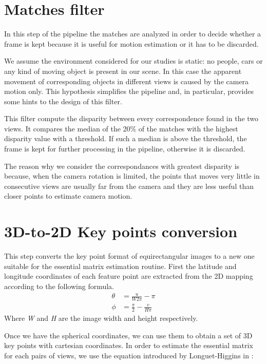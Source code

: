 \section{Matches filter}
In this step of the pipeline the matches are analyzed in order to decide 
whether a frame is kept because it is useful for motion estimation or 
it has to be discarded.

We assume the environment considered for our studies is static: no people, 
cars or any kind of moving object is present in our scene. In this case the 
apparent movement of corresponding objects in different views is caused by 
the camera motion only. This hypothesis simplifies the pipeline and, 
in particular, provides some hints to the design of this filter.

This filter compute the disparity between every correspondence found in the 
two views. It compares the median of the 20\% of the matches with the highest 
disparity value with a threshold. If such a median is above 
the threshold, the frame is kept for further processing in the pipeline, 
otherwise it is discarded.

The reason why we consider the correspondances with greatest disparity is 
because, when the camera rotation is limited, the points that moves very little 
in consecutive views are usually far from the camera and they are less
useful than closer points to estimate camera motion. 

\section{3D-to-2D Key points conversion}
This step converts the key point format of equirectangular images to a new one 
suitable for the essential matrix estimation routine.
First the latitude and longitude coordinates of each feature point are 
extracted from the 2D mapping according to the following formula.
\begin{align}
\label{eq:llConversion}
\theta &= \frac{u}{W 2 \pi} - \pi \\
\phi &= \frac{\pi}{2} - \frac{v}{H \pi}
\end{align}
Where \textit{W} and \textit{H} are the image width and height respectively.

Once we have the spherical coordinates, we can use them to obtain a set of 3D 
key points with cartesian coordinates. In order to estimate the essential 
matrix for each pairs of views, we use the equation introduced by 
Longuet-Higgins in \cite{longuet1981computer}:

